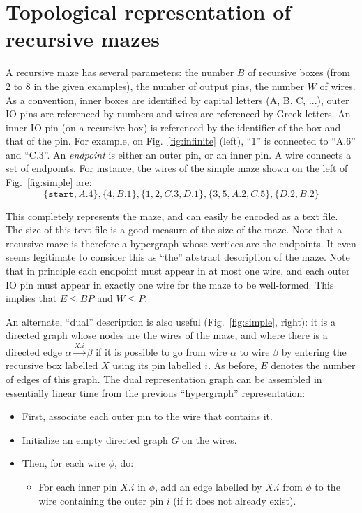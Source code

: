 \documentclass[a4paper,UKenglish,cleveref, autoref]{lipics-v2021}
\begin{document}
\section{Topological representation of recursive mazes}

A recursive maze has several parameters: the number $B$ of recursive boxes (from
2 to 8 in the given examples), the number of output pins, the number $W$ of
wires. As a convention, inner boxes are identified by capital letters (A, B, C,
...), outer IO pins are referenced by numbers and wires are referenced by Greek
letters. An inner IO pin (on a recursive box) is referenced by the identifier of
the box and that of the pin. For example, on Fig.~\ref{fig:infinite} (left),
``1'' is connected to ``A.6'' and ``C.3''.  An \emph{endpoint} is either an
outer pin, or an inner pin. A wire connects a set of endpoints. For instance,
the wires of the simple maze shown on the left of Fig.~\ref{fig:simple} are:
\[
  \{\texttt{start}, A.4\}, 
  \{4, B.1\}, 
  \{1, 2, C.3, D.1\},
  \{3, 5, A.2, C.5\}, 
  \{D.2, B.2\}
\]

This completely represents the maze, and can easily be encoded as a text
file. The size of this text file is a good measure of the size of the maze. Note
that a recursive maze is therefore a hypergraph whose vertices are the
endpoints.  It even seems legitimate to consider this as ``the'' abstract
description of the maze. Note that in principle each endpoint must appear in at
most one wire, and each outer IO pin must appear in exactly one wire for
the maze to be well-formed. This implies that $E \leq BP$ and $W \leq P$.

An alternate, ``dual'' description is also useful (Fig.~\ref{fig:simple},
right): it is a directed graph whose nodes are the wires of the maze, and where
there is a directed edge $\alpha \xrightarrow{X.i} \beta$ if it is possible to
go from wire $\alpha$ to wire $\beta$ by entering the recursive box labelled $X$
using its pin labelled $i$. As before, $E$ denotes the number of edges of this
graph. The dual representation graph can be assembled in essentially linear time
from the previous ``hypergraph'' representation:
\begin{itemize}
\item First, associate each outer pin to the wire that contains it.
\item Initialize an empty directed graph $G$ on the wires.
\item Then, for each wire $\phi$, do:
  \begin{itemize}
  \item For each inner pin $X.i$ in $\phi$, add an edge labelled by $X.i$ from
    $\phi$ to the wire containing the outer pin $i$ (if it does not already
    exist).
  \end{itemize}
\end{itemize}
\end{document}
